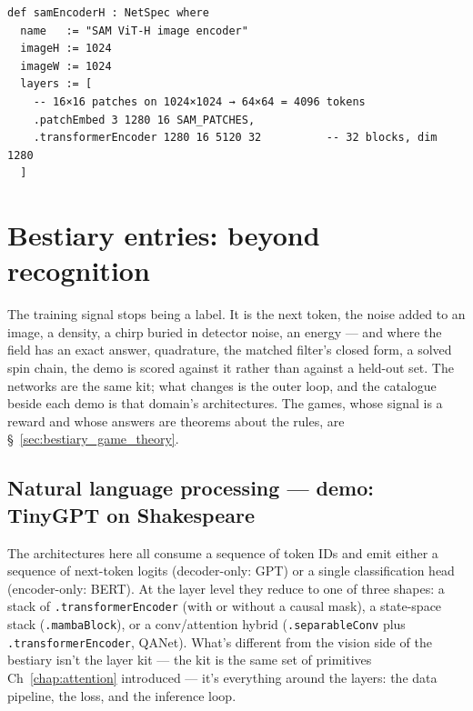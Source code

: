 \begin{verbatim}
def samEncoderH : NetSpec where
  name   := "SAM ViT-H image encoder"
  imageH := 1024
  imageW := 1024
  layers := [
    -- 16×16 patches on 1024×1024 → 64×64 = 4096 tokens
    .patchEmbed 3 1280 16 SAM_PATCHES,
    .transformerEncoder 1280 16 5120 32          -- 32 blocks, dim 1280
  ]
\end{verbatim}

\section{Bestiary entries: beyond recognition}
\label{sec:bestiary_beyond_recognition}

The training signal stops being a label. It is the next token, the noise
added to an image, a density, a chirp buried in detector noise, an energy
--- and where the field has an exact answer, quadrature, the matched
filter's closed form, a solved spin chain, the demo is scored against it
rather than against a held-out set. The networks are the same kit; what
changes is the outer loop, and the catalogue beside each demo is that
domain's architectures. The games, whose signal is a reward and whose
answers are theorems about the rules, are \S~\ref{sec:bestiary_game_theory}.

\subsection{Natural language processing --- demo: TinyGPT on Shakespeare}
\label{sec:bestiary_nlp}

The architectures here all consume a sequence of token IDs and emit
either a sequence of next-token logits (decoder-only: GPT) or a single
classification head (encoder-only: BERT). At the layer level they
reduce to one of three shapes: a stack of \texttt{.transformerEncoder}
(with or without a causal mask), a state-space stack
(\texttt{.mambaBlock}), or a conv/attention hybrid
(\texttt{.separableConv} plus \texttt{.transformerEncoder}, QANet).
What's different from the vision side of the bestiary isn't the layer
kit --- the kit is the same set of primitives Ch~\ref{chap:attention}
introduced --- it's everything around the layers: the data
pipeline, the loss, and the inference loop.

